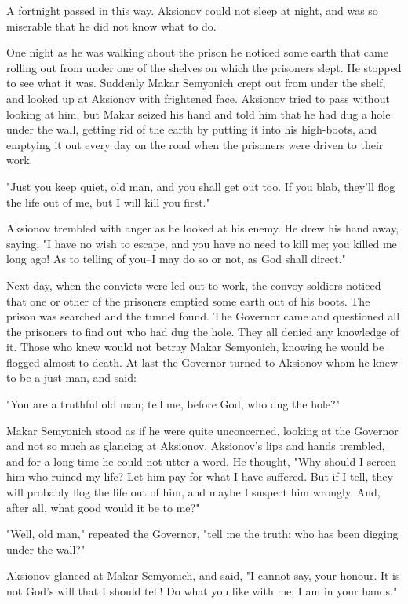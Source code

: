 A fortnight passed in this way. Aksionov could not sleep at night, and
was so miserable that he did not know what to do.

One night as he was walking about the prison he noticed some earth
that came rolling out from under one of the shelves on which the
prisoners slept. He stopped to see what it was. Suddenly Makar
Semyonich crept out from under the shelf, and looked up at Aksionov
with frightened face. Aksionov tried to pass without looking at him,
but Makar seized his hand and told him that he had dug a hole under
the wall, getting rid of the earth by putting it into his high-boots,
and emptying it out every day on the road when the prisoners were
driven to their work.

"Just you keep quiet, old man, and you shall get out too. If you blab,
they'll flog the life out of me, but I will kill you first."

Aksionov trembled with anger as he looked at his enemy. He drew his
hand away, saying, "I have no wish to escape, and you have no need to
kill me; you killed me long ago! As to telling of you--I may do so or
not, as God shall direct."

Next day, when the convicts were led out to work, the convoy soldiers
noticed that one or other of the prisoners emptied some earth out of
his boots. The prison was searched and the tunnel found. The Governor
came and questioned all the prisoners to find out who had dug the
hole. They all denied any knowledge of it. Those who knew would not
betray Makar Semyonich, knowing he would be flogged almost to death.
At last the Governor turned to Aksionov whom he knew to be a just man,
and said:

"You are a truthful old man; tell me, before God, who dug the hole?"

Makar Semyonich stood as if he were quite unconcerned, looking at the
Governor and not so much as glancing at Aksionov. Aksionov's lips and
hands trembled, and for a long time he could not utter a word. He
thought, "Why should I screen him who ruined my life? Let him pay for
what I have suffered. But if I tell, they will probably flog the life
out of him, and maybe I suspect him wrongly. And, after all, what good
would it be to me?"

"Well, old man," repeated the Governor, "tell me the truth: who has
been digging under the wall?"

Aksionov glanced at Makar Semyonich, and said, "I cannot say, your
honour. It is not God's will that I should tell! Do what you like with
me; I am in your hands."

